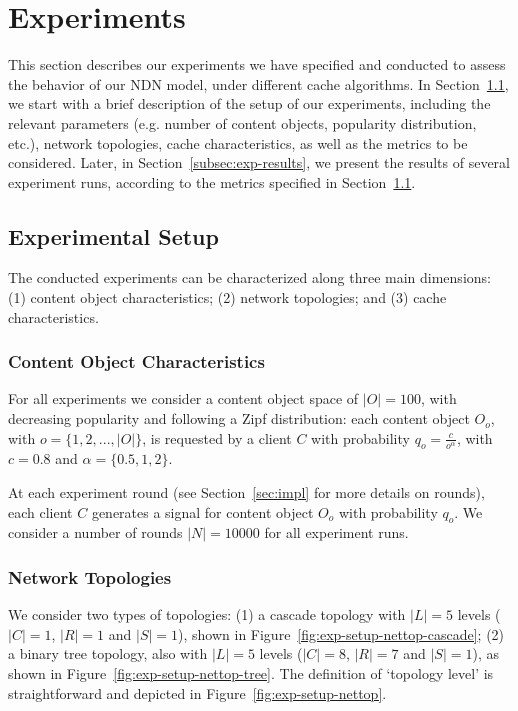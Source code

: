 \section{Experiments}
\label{sec:experiments}

This section describes our experiments we have specified and conducted to assess 
the behavior of 
our NDN model, under different cache algorithms. In 
Section~\ref{subsec:exp-setup}, we start 
with a brief description of the setup of our experiments, 
including the relevant parameters (e.g. number of content objects, popularity 
distribution, etc.), network topologies, cache characteristics, as well as the 
metrics to be considered. Later, in Section~\ref{subsec:exp-results}, we 
present the results of several experiment runs, according to the metrics 
specified in Section~\ref{subsec:exp-setup}.

\subsection{Experimental Setup}
\label{subsec:exp-setup}

The conducted experiments can be characterized along three main dimensions: (1) 
content object characteristics; (2) network topologies; and (3) cache 
characteristics.\shortvertbreak

\subsubsection{Content Object Characteristics}
\label{subsec:exp-setup-cobj}

For all experiments we consider a content object space of 
$|O| = 100$, with decreasing popularity and following a Zipf distribution: 
each content object $O_o$, with $o = \{1,2,...,|O|\}$, is requested by a client 
$C$ with probability $q_{o} = \frac{c}{o^{\alpha}}$, with $c = 0.8$ and 
$\alpha = \{0.5, 1, 2\}$.\shortvertbreak

At each experiment round (see Section~\ref{sec:impl} for more details on 
rounds), each client $C$ generates a signal for content object $O_o$ with 
probability $q_{o}$. We consider a number of rounds 
$|N| = 10000$ for all experiment runs.\shortvertbreak

\subsubsection{Network Topologies}
\label{subsec:exp-setup-nettop}

We consider two types of topologies: (1) a cascade topology with $|L| = 5$ levels 
($|C| = 1$, $|R| = 1$ and $|S| = 1$), shown in Figure~\ref{fig:exp-setup-nettop-cascade}; (2) a binary 
tree topology, also with $|L| = 5$ levels ($|C| = 8$, $|R| = 7$ and $|S| = 1$), as 
shown in Figure~\ref{fig:exp-setup-nettop-tree}. The definition of `topology level' is straightforward and depicted 
in Figure~\ref{fig:exp-setup-nettop}.\shortvertbreak

